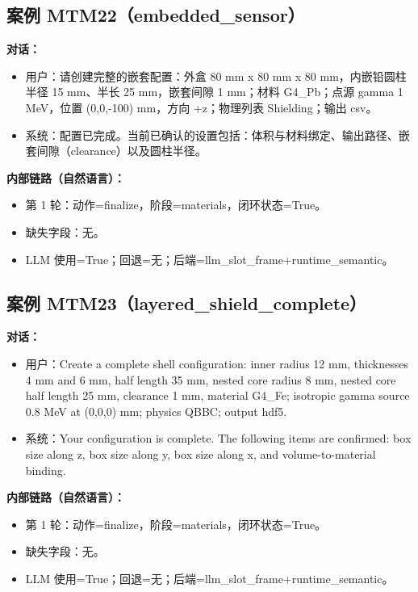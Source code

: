 \documentclass[11pt]{ctexart}
\begin{document}
\subsection{案例 MTM22（embedded\_sensor）}
\textbf{对话：}
\begin{itemize}
\item 用户：请创建完整的嵌套配置：外盒 80 mm x 80 mm x 80 mm，内嵌铅圆柱半径 15 mm、半长 25 mm，嵌套间隙 1 mm；材料 G4\_Pb；点源 gamma 1 MeV，位置 (0,0,-100) mm，方向 +z；物理列表 Shielding；输出 csv。
\item 系统：配置已完成。当前已确认的设置包括：体积与材料绑定、输出路径、嵌套间隙（clearance）以及圆柱半径。
\end{itemize}
\textbf{内部链路（自然语言）：}
\begin{itemize}
\item 第 1 轮：动作=finalize，阶段=materials，闭环状态=True。
\item 缺失字段：无。
\item LLM 使用=True；回退=无；后端=llm\_slot\_frame+runtime\_semantic。
\end{itemize}
\subsection{案例 MTM23（layered\_shield\_complete）}
\textbf{对话：}
\begin{itemize}
\item 用户：Create a complete shell configuration: inner radius 12 mm, thicknesses 4 mm and 6 mm, half length 35 mm, nested core radius 8 mm, nested core half length 25 mm, clearance 1 mm, material G4\_Fe; isotropic gamma source 0.8 MeV at (0,0,0) mm; physics QBBC; output hdf5.
\item 系统：Your configuration is complete. The following items are confirmed: box size along z, box size along y, box size along x, and volume-to-material binding.
\end{itemize}
\textbf{内部链路（自然语言）：}
\begin{itemize}
\item 第 1 轮：动作=finalize，阶段=materials，闭环状态=True。
\item 缺失字段：无。
\item LLM 使用=True；回退=无；后端=llm\_slot\_frame+runtime\_semantic。
\end{itemize}
\end{document}
